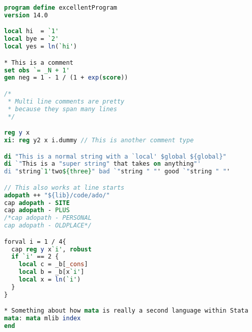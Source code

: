 \documentclass[11pt]{article}
\begin{document}
\clearpage
\begin{lstlisting}[language=stata,style=stata-editor]
program define excellentProgram
version 14.0

local hi  = `1'
local bye = `2'
local yes = ln(`hi')

* This is a comment
set obs `= _N + 1'
gen neg = 1 - 1 / (1 + exp(score))

/*
 * Multi line comments are pretty
 * because they span many lines
 */

reg y x
xi: reg y2 x i.dummy // This is another comment type

di "This is a normal string with a `local' $global ${global}"
di `"This is a "super string" that takes on anything"'
di "string`1'two${three}" bad `"string " "' good `"string " "'

// This also works at line starts
adopath ++ "${lib}/code/ado/"
cap adopath - SITE
cap adopath - PLUS
/*cap adopath - PERSONAL
cap adopath - OLDPLACE*/

forval i = 1 / 4{
  cap reg y x`i', robust
  if `i' == 2 {
    local c = _b[_cons]
    local b = _b[x`i']
    local x = ln(`i')
  }
}

* Something about how mata is really a second language within Stata
mata: mata mlib index
end
\end{lstlisting}

\end{document}
